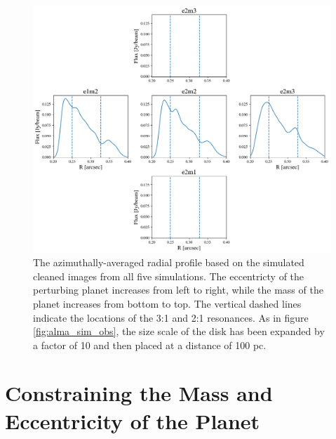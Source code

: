 \documentclass[twocolumn]{aastex63}
\begin{document}
\begin{figure}
    \includegraphics[width=\textwidth]{figures/alma_profiles.png}
    \caption{The azimuthally-averaged radial profile based on the simulated cleaned images from all five simulations. The eccentricty of the perturbing planet increases from left to right, while the mass of the planet increases from bottom to top. The vertical dashed lines indicate the locations of the 3:1 and 2:1 resonances. As in figure \ref{fig:alma_sim_obs}, the size scale of the disk has been expanded by a factor of 10 and then placed at a distance of 100 pc.\label{fig:alma_profiles}}
\end{figure}

\section{Constraining the Mass and Eccentricity of the Planet}\label{sec:constrain}
\end{document}
